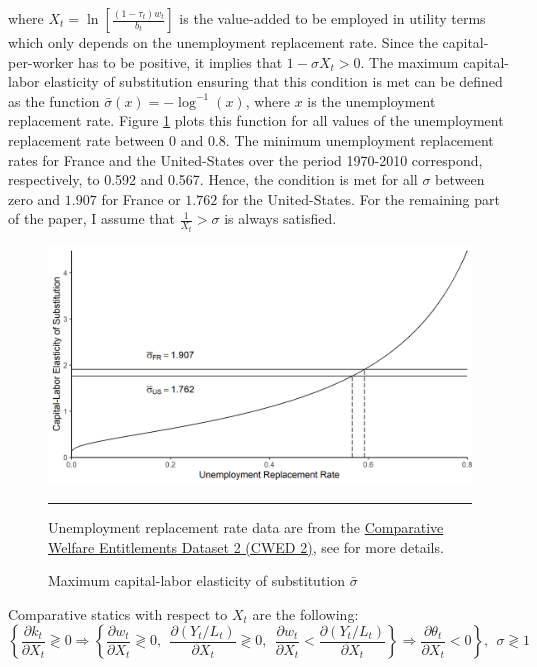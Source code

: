 where $X_t=\ln\left[\frac{(1-\tau_t)w_t}{b_t}\right]$ is the value-added to be employed in utility terms which only depends on the unemployment replacement rate. Since the capital-per-worker has to be positive, it implies that $1-\sigma X_t > 0$. The maximum capital-labor elasticity of substitution ensuring that this condition is met can be defined as the function $\bar{\sigma}(x) = -\log^{-1}(x)$, where $x$ is the unemployment replacement rate. Figure \ref{fig:xsigma} plots this function for all values of the unemployment replacement rate between 0 and 0.8. The minimum unemployment replacement rates for France and the United-States over the period 1970-2010 correspond, respectively, to 0.592 and 0.567. Hence, the condition is met for all $\sigma$ between zero and $1.907$ for France or $1.762$ for the United-States. For the remaining part of the paper, I assume that $\frac{1}{X_t}>\sigma$ is always satisfied.
	\begin{figure}[tb]
		\centering
		\includegraphics[width = 1\linewidth]{../result/xsigma.png}
		\caption{Maximum capital-labor elasticity of substitution $\bar{\sigma}$}
		\label{fig:xsigma}
		\vspace{.5ex}
		\hrule
		\vspace{-4ex}
		\justify\singlespacing\footnotesize Unemployment replacement rate data are from the \href{http://cwed2.org/}{Comparative Welfare Entitlements Dataset 2 (CWED 2)}, see \cite{CWED2017} for more details.
	\end{figure}
Comparative statics with respect to $X_t$ are the following:
	\begin{equation*}
	\left\lbrace \frac{\partial k_t}{\partial X_t} \gtrless 0 \Rightarrow 
	\left\lbrace \frac{\partial w_t}{\partial X_t} \gtrless 0,~~
	\frac{\partial (Y_t/L_t)}{\partial X_t} \gtrless 0,~~ \frac{\partial w_t}{\partial X_t} <
	\frac{\partial (Y_t/L_t)}{\partial X_t} \right\rbrace \Rightarrow 
	\frac{\partial \theta_t}{\partial X_t} < 0
	\right\rbrace, ~~ \sigma \gtrless 1
	\end{equation*}
